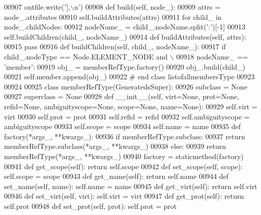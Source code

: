 \begin{DoxyCode}
{{{{{{{{{{{{{{{{{{{{{{{{{{{{{{{{{{{{{00907         outfile.write(\textcolor{stringliteral}{'],\(\backslash\)n'})
00908     \textcolor{keyword}{def }build(self, node\_):
00909         attrs = node\_.attributes
00910         self.buildAttributes(attrs)
00911         \textcolor{keywordflow}{for} child\_ \textcolor{keywordflow}{in} node\_.childNodes:
00912             nodeName\_ = child\_.nodeName.split(\textcolor{stringliteral}{':'})[-1]
00913             self.buildChildren(child\_, nodeName\_)
00914     \textcolor{keyword}{def }buildAttributes(self, attrs):
00915         \textcolor{keywordflow}{pass}
00916     \textcolor{keyword}{def }buildChildren(self, child\_, nodeName\_):
00917         \textcolor{keywordflow}{if} child\_.nodeType == Node.ELEMENT\_NODE \textcolor{keywordflow}{and} \(\backslash\)
00918             nodeName\_ == \textcolor{stringliteral}{'member'}:
00919             obj\_ = memberRefType.factory()
00920             obj\_.build(child\_)
00921             self.member.append(obj\_)
00922 \textcolor{comment}{# end class listofallmembersType}
00923 
00924 
00925 \textcolor{keyword}{class }memberRefType(GeneratedsSuper):
00926     subclass = \textcolor{keywordtype}{None}
00927     superclass = \textcolor{keywordtype}{None}
00928     \textcolor{keyword}{def }__init__(self, virt=None, prot=None, refid=None, ambiguityscope=None, scope=None, name=None):
00929         self.virt = virt
00930         self.prot = prot
00931         self.refid = refid
00932         self.ambiguityscope = ambiguityscope
00933         self.scope = scope
00934         self.name = name
00935     \textcolor{keyword}{def }factory(*args\_, **kwargs\_):
00936         \textcolor{keywordflow}{if} memberRefType.subclass:
00937             \textcolor{keywordflow}{return} memberRefType.subclass(*args\_, **kwargs\_)
00938         \textcolor{keywordflow}{else}:
00939             \textcolor{keywordflow}{return} memberRefType(*args\_, **kwargs\_)
00940     factory = staticmethod(factory)
00941     \textcolor{keyword}{def }get_scope(self): \textcolor{keywordflow}{return} self.scope
00942     \textcolor{keyword}{def }set_scope(self, scope): self.scope = scope
00943     \textcolor{keyword}{def }get_name(self): \textcolor{keywordflow}{return} self.name
00944     \textcolor{keyword}{def }set_name(self, name): self.name = name
00945     \textcolor{keyword}{def }get_virt(self): \textcolor{keywordflow}{return} self.virt
00946     \textcolor{keyword}{def }set_virt(self, virt): self.virt = virt
00947     \textcolor{keyword}{def }get_prot(self): \textcolor{keywordflow}{return} self.prot
00948     \textcolor{keyword}{def }set_prot(self, prot): self.prot = prot
}}}}}}}}}}}}}}}}}}}}}}}}}}}}}}}}}}}}}
\end{DoxyCode}
